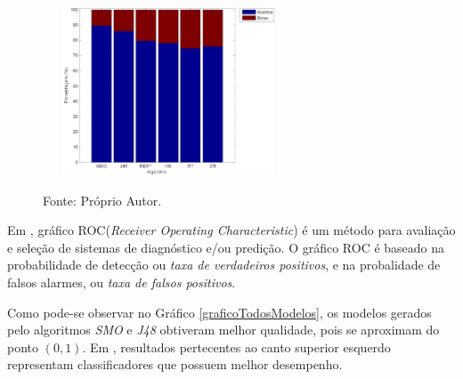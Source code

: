 \documentclass[
	12pt,				%
	openright,			%
	oneside,	
	a4paper,				%
	english,				%
	brazil				%
]{abntex2/abntex2} %
\begin{document}
\begin{figure}[!htb]
{			\includegraphics[width=07.5cm, height=05cm]{graphs/perc_hits_20k.png}}
		\begin{center}
		\end{center}
		{\fontsize{10}{\baselineskip} \selectfont Fonte: Próprio Autor.}
	\end{figure}
	

	
	Em \cite{prati:2008}, gráfico ROC(\textit{Receiver Operating Characteristic}) é um método para avaliação e seleção de sistemas de diagnóstico e/ou predição. O gráfico ROC é baseado na probabilidade de detecção ou \textit{taxa de verdadeiros positivos}, e na probalidade de falsos alarmes, ou \textit{taxa de falsos positivos}.
	
	Como pode-se observar no Gráfico \ref{graficoTodosModelos}, os modelos gerados pelo algoritmos \textit{SMO} e \textit{J48} obtiveram melhor qualidade, pois se aproximam do ponto $(0,1)$.  Em \cite{prati:2008}, resultados pertecentes ao canto superior esquerdo representam classificadores que possuem melhor desempenho.
	
\end{document}
